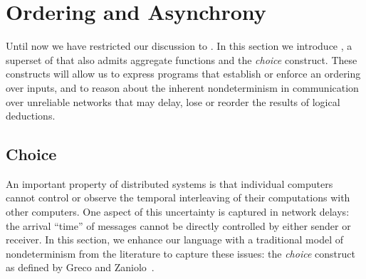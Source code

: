 \section{Ordering and Asynchrony}
\label{sec:async}

%    

Until now we have restricted our discussion to \slang.  In this section we
introduce \lang, a superset of \slang that also admits aggregate functions
and the \emph{choice} construct.  These constructs will allow us to
express programs that establish or enforce an ordering over inputs, and to
reason about the inherent nondeterminism in communication over unreliable
networks that may delay, lose or reorder the results of logical deductions. 


\subsection{Choice}



An important property of distributed systems is that individual computers cannot control or observe the temporal interleaving of their computations with other computers.  One aspect of this uncertainty is captured in network delays: the arrival ``time'' of messages cannot be directly controlled by either sender or receiver.  In this section, we enhance our language with a traditional model of nondeterminism from the literature to capture these issues: the \emph{choice} construct as defined by Greco and Zaniolo~\cite{greedychoice}.

